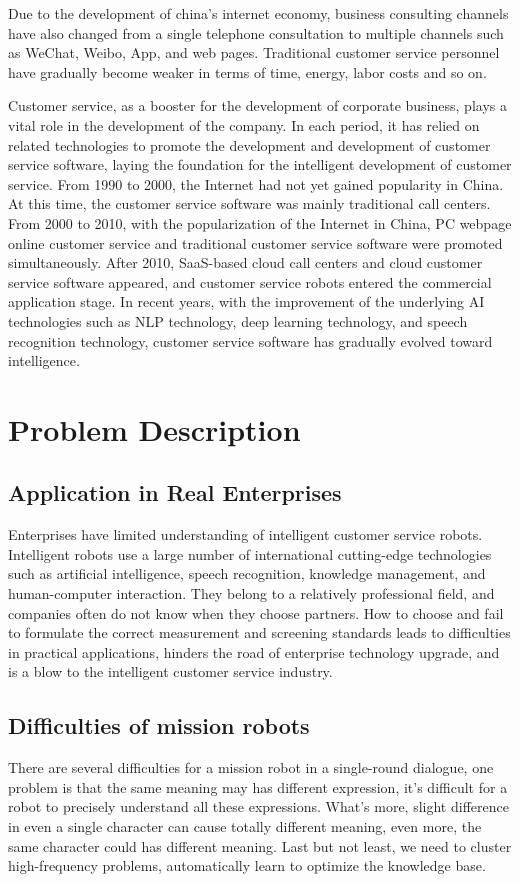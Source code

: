 \documentclass[11pt,en,number]{elegantpaper}
\begin{document}
	Due to the development of china's internet economy, business consulting channels have also changed from a single telephone consultation to multiple channels such as WeChat, Weibo, App, and web pages. Traditional customer service personnel have gradually become weaker in terms of time, energy, labor costs and so on.
	
	Customer service, as a booster for the development of corporate business, plays a vital role in the development of the company. In each period, it has relied on related technologies to promote the development and development of customer service software, laying the foundation for the intelligent development of customer service. From 1990 to 2000, the Internet had not yet gained popularity in China. At this time, the customer service software was mainly traditional call centers. From 2000 to 2010, with the popularization of the Internet in China, PC webpage online customer service and traditional customer service software were promoted simultaneously. After 2010, SaaS-based cloud call centers and cloud customer service software appeared, and customer service robots entered the commercial application stage. In recent years, with the improvement of the underlying AI technologies such as NLP technology, deep learning technology, and speech recognition technology, customer service software has gradually evolved toward intelligence\cite{3}.
	
	
\section{Problem Description}
	\subsection{Application in Real Enterprises}
	Enterprises have limited understanding of intelligent customer service robots. Intelligent robots use a large number of international cutting-edge technologies such as artificial intelligence, speech recognition, knowledge management, and human-computer interaction. They belong to a relatively professional field, and companies often do not know when they choose partners. How to choose and fail to formulate the correct measurement and screening standards leads to difficulties in practical applications, hinders the road of enterprise technology upgrade, and is a blow to the intelligent customer service industry\cite{4}.

	\subsection{Difficulties of mission robots}
	There are several difficulties for a mission robot in a single-round dialogue, one problem is that the same meaning may has different expression, it's difficult for a robot to precisely understand all these expressions. What's more, slight difference in even a single character can cause totally different meaning, even more, the same character could has different meaning. Last but not least, we need to cluster high-frequency problems, automatically learn to optimize the knowledge base\cite{5}.
\end{document}
